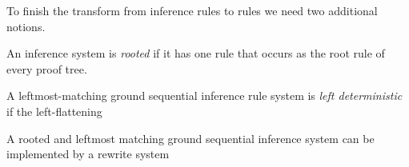 \documentclass[11pt]{article} %
\begin{document}
To finish the transform from inference rules to \HAX rules we need two additional notions.

\begin{definition}
  An inference system is \emph{rooted} if it has one rule that occurs as the root rule of every
  proof tree.
\end{definition}

\begin{definition}
  A leftmost-matching ground sequential inference rule system is \emph{left deterministic} if the
  left-flattening 
\end{definition}

\begin{theorem}
  A rooted and leftmost matching ground sequential inference system can be implemented by a rewrite
  system 
\end{theorem}



\end{document}

